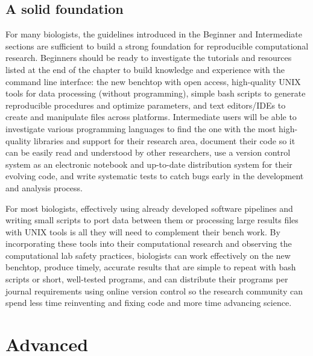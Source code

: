 \documentclass[ChapterTOCs,krantz2]{krantz} %
\newcommand{\unix}{UNIX}
\begin{document}
\subsection{A solid foundation} 

For many biologists, the guidelines introduced in the Beginner and Intermediate
sections are sufficient to build a strong foundation for reproducible
computational research.  Beginners should be ready to investigate the tutorials
and resources listed at the end of the chapter to build knowledge and
experience with the command line interface: the new benchtop with open access,
high-quality \unix{} tools for data processing (without programming), simple bash
scripts to generate reproducible procedures and optimize parameters, and text
editors/IDEs to create and manipulate files across platforms.  Intermediate
users
will be able to investigate various programming languages to find the one with
the most high-quality libraries and support for their research area, document
their code so it can be easily read and understood by other researchers, use a
version control system as an electronic notebook and up-to-date distribution
system for their evolving code, and write systematic tests to catch bugs early
in the development and analysis process. 

For most biologists, effectively using already developed software pipelines and writing
small scripts to port data between them or processing large results files with
\unix{} tools is all they will need to complement their bench work.  By
incorporating these tools into their computational research and observing the
computational lab safety practices, biologists can work
effectively on the new benchtop, produce timely, accurate results that are
simple to repeat with bash scripts or short, well-tested programs, and can
distribute their programs per journal requirements using online version control
so the research community can spend less time reinventing and fixing code and
more time advancing science. 

\section{Advanced}
\end{document}
